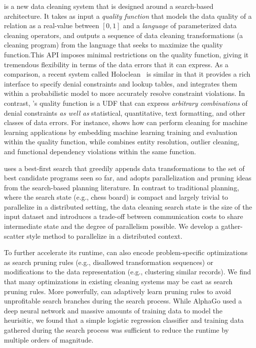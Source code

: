 \sys is a new data cleaning system that is designed around a search-based architecture. It takes as input a {\it quality function} that models the data quality of a relation as a real-value between $[0,1]$ and a {\it language} of parameterized data cleaning operators, and outputs a sequence of data cleaning transformations (a cleaning program) from the language that seeks to maximize the quality function.This API imposes minimal restrictions on the quality function, giving it tremendous flexibility in terms of the data errors that it can express.   As a comparison, a recent system called Holoclean~\cite{holoclean} is similar in that it provides a rich interface to specify denial constraints and lookup tables, and integrates them within a probabilistic model to more accurately resolve constraint violations.  In contrast, \sys's quality function is a UDF that can express {\it arbitrary combinations} of denial constraints {\it as well as} statistical, quantitative, text formatting, and other classes of data errors.  For instance,  shows how \sys can perform cleaning for machine learning applications by embedding machine learning training and evaluation within the quality function, while  combines entity resolution, outlier cleaning, and functional dependency violations within the same function.  

\sys uses a best-first search that greedily appends data transformations to the set of best candidate programs seen so far, and adopts parallelization and pruning ideas from the search-based planning literature.  In contrast to traditional planning, where the search state (e.g., chess board) is compact and largely trivial to parallelize in a distributed setting, the data cleaning search state is the size of the input dataset and introduces a trade-off between communication costs to share intermediate state and the degree of parallelism possible.  We develop a gather-scatter style method to parallelize \sys in a distributed context. 

To further accelerate its runtime, \sys can also encode problem-specific optimizations as search pruning rules (e.g., disallowed transformation sequences) or modifications to the data representation (e.g., clustering similar records).  We find that many optimizations in existing cleaning systems may be cast as search pruning rules.
More powerfully, \sys can adaptively learn pruning rules to avoid unprofitable search branches during the search process. 
While AlphaGo used a deep neural network and massive amounts of training data to model the heurisitic, we found that a simple logistic regression classifier and training data gathered during the search process was sufficient to reduce the runtime by multiple orders of magnitude. 


